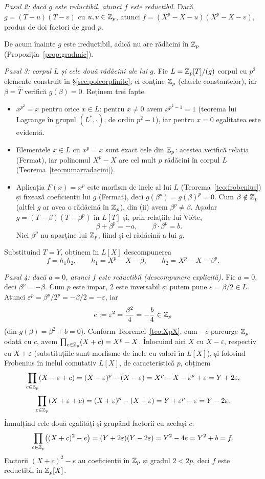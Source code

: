 \begin{solutie}
\emph{Pasul 2: dacă $g$ este reductibil, atunci $f$ este reductibil.} Dacă $g=(T-u)(T-v)$ cu $u,v\in\mathbb{Z}_p$, atunci $f=(X^p-X-u)(X^p-X-v)$, produs de doi factori de grad $p$.

De acum înainte $g$ este ireductibil, adică nu are rădăcini în $\mathbb{Z}_p$ (Propoziția~\ref{prop:gradmic}).

\emph{Pasul 3: corpul $L$ și cele două rădăcini ale lui $g$.} Fie $L=\mathbb{Z}_p[T]/(g)$ corpul cu $p^2$ elemente construit în §\ref{sec:polcorpfinite}; el conține $\mathbb{Z}_p$ (clasele constantelor), iar $\beta=\widehat T$ verifică $g(\beta)=0$. Reținem trei fapte.
\begin{itemize}
\item[(i)] $x^{p^2}=x$ pentru orice $x\in L$: pentru $x\neq0$ avem $x^{p^2-1}=1$ (teorema lui Lagrange în grupul $(L^*,\cdot)$, de ordin $p^2-1$), iar pentru $x=0$ egalitatea este evidentă.
\item[(ii)] Elementele $x\in L$ cu $x^p=x$ sunt exact cele din $\mathbb{Z}_p$: acestea verifică relația (Fermat), iar polinomul $X^p-X$ are cel mult $p$ rădăcini în corpul $L$ (Teorema~\ref{teo:numarradacini}).
\item[(iii)] Aplicația $F(x)=x^p$ este morfism de inele al lui $L$ (Teorema~\ref{teo:frobenius}) și fixează coeficienții lui $g$ (Fermat), deci $g(\beta^p)=g(\beta)^p=0$. Cum $\beta\notin\mathbb{Z}_p$ (altfel $g$ ar avea o rădăcină în $\mathbb{Z}_p$), din (ii) avem $\beta^p\neq\beta$. Așadar $g=(T-\beta)(T-\beta^p)$ în $L[T]$ și, prin relațiile lui Viète,
\[
  \beta+\beta^p=-a,\qquad \beta\cdot\beta^p=b .
\]
Nici $\beta^p$ nu aparține lui $\mathbb{Z}_p$, fiind și el rădăcină a lui $g$.
\end{itemize}
Substituind $T=Y$, obținem în $L[X]$ descompunerea
\[
  f=h_1h_2,\qquad h_1=X^p-X-\beta,\qquad h_2=X^p-X-\beta^p. \tag{3}
\]

\emph{Pasul 4: dacă $a=0$, atunci $f$ este reductibil (descompunere explicită).} Fie $a=0$, deci $\beta^p=-\beta$. Cum $p$ este impar, $2$ este inversabil și putem pune $\varepsilon=\beta/2\in L$. Atunci $\varepsilon^p=\beta^p/2^p=-\beta/2=-\varepsilon$, iar
\[
  e:=\varepsilon^2=\frac{\beta^2}{4}=-\frac{b}{4}\in\mathbb{Z}_p
\]
(din $g(\beta)=\beta^2+b=0$). Conform Teoremei~\ref{teo:XpX}, cum $-c$ parcurge $\mathbb{Z}_p$ odată cu $c$, avem $\prod_{c\in\mathbb{Z}_p}(X+c)=X^p-X$. Înlocuind aici $X$ cu $X-\varepsilon$, respectiv cu $X+\varepsilon$ (substituțiile sunt morfisme de inele cu valori în $L[X]$), și folosind Frobenius în inelul comutativ $L[X]$, de caracteristică $p$, obținem
\[
  \prod_{c\in\mathbb{Z}_p}(X-\varepsilon+c)=(X-\varepsilon)^p-(X-\varepsilon)=X^p-X-\varepsilon^p+\varepsilon=Y+2\varepsilon,
\]
\[
  \prod_{c\in\mathbb{Z}_p}(X+\varepsilon+c)=(X+\varepsilon)^p-(X+\varepsilon)=Y+\varepsilon^p-\varepsilon=Y-2\varepsilon .
\]
Înmulțind cele două egalități și grupând factorii cu același $c$:
\[
  \prod_{c\in\mathbb{Z}_p}\bigl((X+c)^2-e\bigr)=(Y+2\varepsilon)(Y-2\varepsilon)=Y^2-4e=Y^2+b=f .
\]
Factorii $(X+c)^2-e$ au coeficienții în $\mathbb{Z}_p$ și gradul $2<2p$, deci $f$ este reductibil în $\mathbb{Z}_p[X]$.


\end{solutie}
